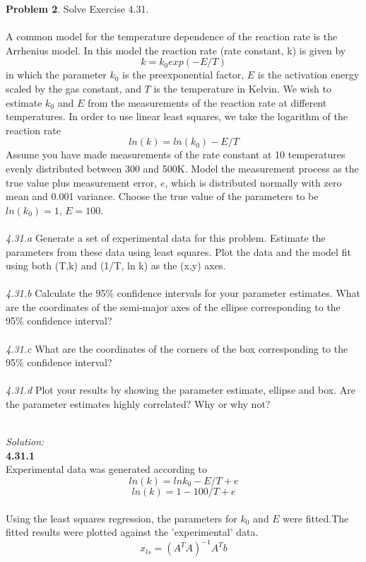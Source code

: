 \documentclass[10pt]{article}
\begin{document}
\noindent\colorbox{mygray}{\begin{minipage}{\textwidth}
  {\bf Problem 2}. Solve Exercise 4.31. \\ \\
  A common model for the temperature dependence of the reaction rate is the Arrhenius model. In this model the reaction rate (rate constant, k) is given by 
\[k = k_0exp(-E/T)\]
in which the parameter $k_0$ is the preexponential factor, $E$ is the activation energy scaled by the gas constant, and $T$ is the temperature in Kelvin. We wish to estimate $k_0$ and $E$ from the measurements of the reaction rate at different temperatures. In order to use linear least squares, we take the logarithm of the reaction rate 
\[ln(k) = ln(k_0) - E/T\]
Assume you have made measurements of the rate constant at 10 temperatures evenly distributed between 300 and 500K. Model the measurement process as the true value plus measurement error, $e$, which is distributed normally with zero mean and 0.001 variance. Choose the true value of the parameters to be $ln(k_0) = 1$, $E=100$. \\ \\
  \textit{4.31.a} Generate a set of experimental data for this problem. Estimate the parameters from these data using least squares. Plot the data and the model fit using both (T,k) and (1/T, ln k) as the (x,y) axes. \\ \\
  \textit{4.31.b} Calculate the 95\% confidence intervals for your parameter estimates. What are the coordinates of the semi-major axes of the ellipse corresponding to the 95\% confidence interval? \\ \\
  \textit{4.31.c} What are the coordinates of the corners of the box corresponding to the 95\% confidence interval? \\ \\
  \textit{4.31.d} Plot your results by showing the parameter estimate, ellipse and box. Are the parameter estimates highly correlated? Why or why not? 
  
  \end{minipage}}
\\

{\em Solution:}   
\\
{\bf 4.31.1}\\
Experimental data was generated according to 
\[ ln(k)=lnk_0-E/T+e \]
\[ ln(k)=1-100/T+e \]
\\
Using the least squares regression, the parameters for $k_0$ and $E$ were fitted.The fitted results were plotted against the 'experimental' data.
\[ x_{ls}=(A^TA)^{-1}A^T b\]
\end{document}
